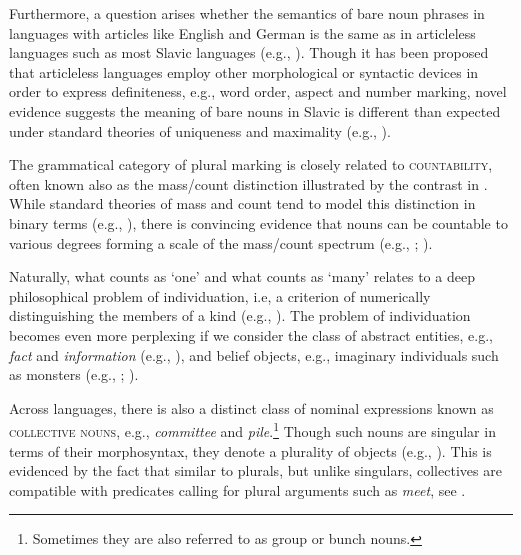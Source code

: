 \documentclass[output=paper]{langscibook}
\begin{document}
\noindent Furthermore, a question arises whether the semantics of bare noun phrases in languages with articles like English and German is the same as in articleless languages such as most Slavic languages (e.g., \citealt{geist2010bare, heim2011definiteness}). Though it has been proposed that articleless languages employ other morphological or syntactic devices in order to express definiteness, e.g., word order, aspect and number marking, novel evidence suggests the meaning of bare nouns in Slavic is different than expected under standard theories of uniqueness and maximality (e.g., ).

The grammatical category of plural marking is closely related to \textsc{countability}, often known also as the mass/count distinction illustrated by the contrast in . While standard theories of mass and count tend to model this distinction in binary terms (e.g., \citealt{link1983logical, chierchia1998plurality, chierchia2010mass}), there is convincing evidence that nouns can be countable to various degrees forming a scale of the mass/count spectrum (e.g., \citealt{allan1980nouns}; ). 

\ea\label{doc-wag:ex:countability}
\z 
\z 

\noindent Naturally, what counts as `one' and what counts as `many' relates to a deep philosophical problem of individuation, i.e, a criterion of numerically distinguishing the members of a kind (e.g., \citealt{grimm2012number, wagiel2018subatomic}). The problem of individuation becomes even more perplexing if we consider the class of abstract entities, e.g., \textit{fact} and \textit{information} (e.g., \citealt{grimm2014individuating, sutton2020informational}), and belief objects, e.g., imaginary individuals such as monsters (e.g., \citealt{geach1967intentional}; ).

Across languages, there is also a distinct class of nominal expressions known as \textsc{collective nouns}, e.g., \textit{committee} and \textit{pile}.\footnote{Sometimes they are also referred to as group or bunch nouns.} Though such nouns are singular in terms of their morphosyntax, they denote a plurality of objects (e.g., \citealt{landman1989groupsi, barker1992group, pearson2011new, henderson2017swarms}). This is evidenced by the fact that similar to plurals, but unlike singulars, collectives are compatible with predicates calling for plural arguments such as \textit{meet}, see .
\end{document}
